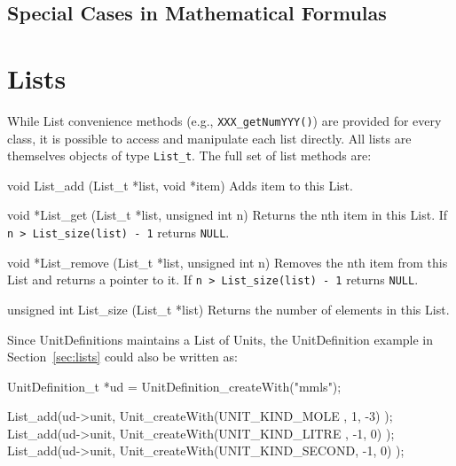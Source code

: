 \documentclass{sbmlmanual}
\begin{document}
\subsection{Special Cases in Mathematical Formulas}
\label{sec:mathml-special-cases}





\clearpage
\appendix
\section{Lists}
\label{app:lists}

While List convenience methods (e.g., \texttt{XXX\_getNumYYY()}) are
provided for every class, it is possible to access and manipulate each
list directly.  All lists are themselves objects of type
\texttt{List\_t}.  The full set of list methods are:


\begin{methoddef}{void List\_add (List\_t *list, void *item)}
  Adds item to this List.
\end{methoddef}

\begin{methoddef}{void *List\_get (List\_t *list, unsigned int n)}
  Returns the nth item in this List.  If \texttt{n > List\_size(list)
  - 1} returns \texttt{NULL}.
\end{methoddef}

\begin{methoddef}{void *List\_remove (List\_t *list, unsigned int n)}
  Removes the nth item from this List and returns a pointer to it.  If
  \texttt{n > List\_size(list) - 1} returns \texttt{NULL}.
\end{methoddef}

\begin{methoddef}{unsigned int List\_size (List\_t *list)}
  Returns the number of elements in this List.
\end{methoddef}


Since UnitDefinitions maintains a List of Units, the UnitDefinition
example in Section~\ref{sec:lists} could also be written as:


\begin{example}[c]
UnitDefinition_t *ud = UnitDefinition_createWith("mmls");

List_add(ud->unit, Unit_createWith(UNIT_KIND_MOLE  ,  1, -3) );
List_add(ud->unit, Unit_createWith(UNIT_KIND_LITRE , -1,  0) );
List_add(ud->unit, Unit_createWith(UNIT_KIND_SECOND, -1,  0) );
\end{example}
\end{document}

